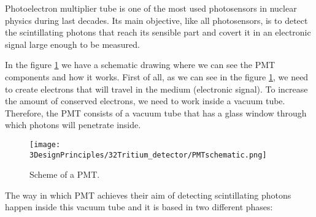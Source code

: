 Photoelectron multiplier tube is one of the most used photosensors in nuclear physics during last decades. Its main objective, like all photosensors, is to detect the scintillating photons that reach its sensible part and covert it in an electronic signal large enough to be measured. 

In the figure \ref{fig:SchemePMT} we have a schematic drawing where we can see the PMT components and how it works. First of all, as we can see in the figure \ref{fig:SchemePMT}, we need to create electrons that will travel in the medium (electronic signal). To increase the amount of conserved electrons, we need to work inside a vacuum tube. Therefore, the PMT consists of a vacuum tube that has a glass window through which photons will penetrate inside. 

\begin{figure}[htbp]
\centering
\texttt{[image: 3DesignPrinciples/32Tritium\_detector/PMTschematic.png]}
\caption{Scheme of a PMT.\label{fig:SchemePMT}~\cite{Knoll}}
\end{figure}

The way in which PMT achieves their aim of detecting scintillating photons happen inside this vacuum tube and it is based in two different phases:

